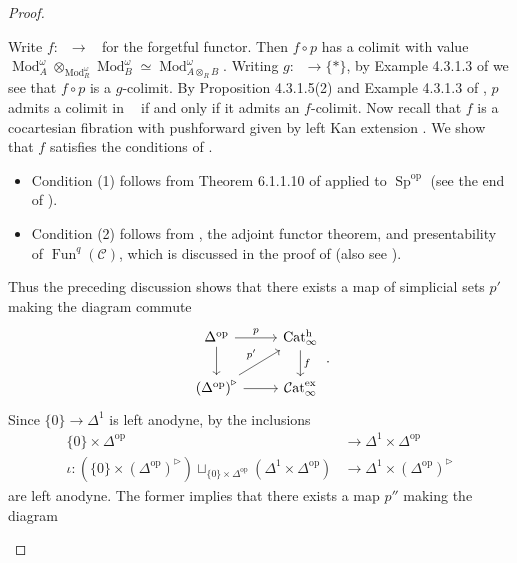 \documentclass{article}
\DeclareMathOperator{\Cat}{\mathcal{C}at} %
\DeclareMathOperator{\Catex}{\Cat_\infty^{ex}} %
\DeclareMathOperator{\Cath}{Cat^h_\infty} %
\DeclareMathOperator{\Fun}{Fun} %
\DeclareMathOperator{\Mod}{Mod} %
\DeclareMathOperator{\Spectra}{Sp} %
\newcommand{\op}{\mathrm{op}} %
\theoremstyle{definition}
\begin{document}
\begin{proof}
\begin{enumerate}
        Write $ f \colon \Cath \to \Catex $ for the forgetful functor. 
        Then $ f \circ p $ has a colimit with value $ \Mod_A^\omega \otimes_{\Mod_R^\omega} \Mod_B^\omega \simeq \Mod_{A \otimes_R B}^\omega $. 
        Writing $ g \colon \Catex \to \{*\} $, by Example 4.3.1.3 of \cite{HTT} we see that $ f \circ p $ is a $ g $-colimit. 
        By Proposition 4.3.1.5(2) and Example 4.3.1.3 of \cite{HTT}, $ p $ admits a colimit in $ \Cath $ if and only if it admits an $ f $-colimit. 
        Now recall that $ f $ is a cocartesian fibration with pushforward given by left Kan extension \cite[Corollary 1.4.2]{CDHHLMNNSI}. 
        We show that $ f $ satisfies the conditions of \cite[Corollary 4.3.1.11]{HTT}. 
        \begin{itemize}
            \item Condition (1) follows from Theorem 6.1.1.10 of \cite{LurHA} applied to $ \Spectra^\op $ (see the end of \cite[Construction 1.1.26]{CDHHLMNNSI}). 
            \item Condition (2) follows from \cite[Corollary 1.4.2]{CDHHLMNNSI}, the adjoint functor theorem, and presentability of $ \Fun^q(\mathcal{C}) $, which is discussed in the proof of \cite[Lemma 5.3.3]{CDHHLMNNSI} (also see \cite[Remark 6.1.1.11]{LurHA}). 
        \end{itemize}
        Thus the preceding discussion shows that there exists a map of simplicial sets $ p' $ making the diagram commute
        \begin{equation*}
        \begin{tikzcd}
            \Delta^\op \ar[d] \ar[r,"p"] & \Cath \ar[d,"f"] \\
            \left(\Delta^\op\right)^{\triangleright} \ar[r]\ar[ru,"{p'}"] & \Catex 
        \end{tikzcd}\,.
        \end{equation*}
        Since $ \{0\} \to \Delta^1 $ is left anodyne, by \cite[Corollary 2.1.2.7]{HTT} the inclusions
        \begin{align*}
            \{0\} \times \Delta^\op & \to \Delta^1 \times \Delta^\op \\
            \iota \colon \left(\{0\} \times (\Delta^\op)^\triangleright\right) \sqcup_{\{0\} \times \Delta^\op}\left(\Delta^1 \times \Delta^\op \right) & \to \Delta^1 \times \left(\Delta^\op\right)^\triangleright 
        \end{align*}
        are left anodyne. 
        The former implies that there exists a map $ p'' $ making the diagram 
        \begin{equation*}

\end{equation*}
\end{enumerate}
\end{proof}
\end{document}
